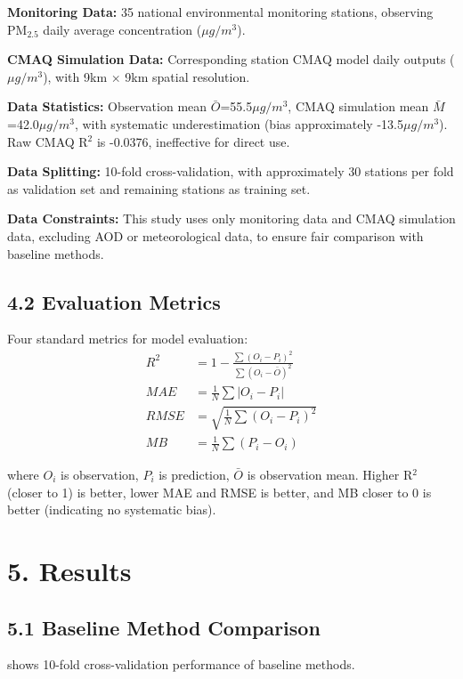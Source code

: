 \documentclass[a4paper]{article}
\begin{document}
\textbf{Monitoring Data:} 35 national environmental monitoring stations, observing PM$_{2.5}$ daily average concentration ($\mu g/m^3$).

\textbf{CMAQ Simulation Data:} Corresponding station CMAQ model daily outputs ($\mu g/m^3$), with 9km $\times$ 9km spatial resolution.

\textbf{Data Statistics:} Observation mean $\bar{O}$=55.5$\mu g/m^3$, CMAQ simulation mean $\bar{M}$=42.0$\mu g/m^3$, with systematic underestimation (bias approximately -13.5$\mu g/m^3$). Raw CMAQ R$^2$ is -0.0376, ineffective for direct use.

\textbf{Data Splitting:} 10-fold cross-validation, with approximately 30 stations per fold as validation set and remaining stations as training set.

\textbf{Data Constraints:} This study uses only monitoring data and CMAQ simulation data, excluding AOD or meteorological data, to ensure fair comparison with baseline methods.

\subsection{4.2 Evaluation Metrics}

Four standard metrics for model evaluation:
\begin{align}
    R^2 &= 1 - \frac{\sum(O_i - P_i)^2}{\sum(O_i - \bar{O})^2} \label{eq:r2} \\
    MAE &= \frac{1}{N}\sum|O_i - P_i| \label{eq:mae} \\
    RMSE &= \sqrt{\frac{1}{N}\sum(O_i - P_i)^2} \label{eq:rmse} \\
    MB &= \frac{1}{N}\sum(P_i - O_i) \label{eq:mb}
\end{align}

where $O_i$ is observation, $P_i$ is prediction, $\bar{O}$ is observation mean. Higher R$^2$ (closer to 1) is better, lower MAE and RMSE is better, and MB closer to 0 is better (indicating no systematic bias).

\section{5. Results}

\subsection{5.1 Baseline Method Comparison}

 shows 10-fold cross-validation performance of baseline methods.
\end{document}
